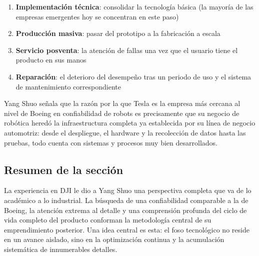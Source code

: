 \begin{enumerate}
    \item \textbf{Implementación técnica}: consolidar la tecnología básica (la mayoría de las empresas emergentes hoy se concentran en este paso)
    \item \textbf{Producción masiva}: pasar del prototipo a la fabricación a escala
    \item \textbf{Servicio posventa}: la atención de fallas una vez que el usuario tiene el producto en sus manos
    \item \textbf{Reparación}: el deterioro del desempeño tras un periodo de uso y el sistema de mantenimiento correspondiente
\end{enumerate}

Yang Shuo señala que la razón por la que Tesla es la empresa más cercana al nivel de Boeing en confiabilidad de robots es precisamente que su negocio de robótica heredó la infraestructura completa ya establecida por su línea de negocio automotriz: desde el despliegue, el hardware y la recolección de datos hasta las pruebas, todo cuenta con sistemas y procesos muy bien desarrollados.

\subsection{Resumen de la sección}

La experiencia en DJI le dio a Yang Shuo una perspectiva completa que va de lo académico a lo industrial. La búsqueda de una confiabilidad comparable a la de Boeing, la atención extrema al detalle y una comprensión profunda del ciclo de vida completo del producto conforman la metodología central de su emprendimiento posterior. Una idea central es esta: el foso tecnológico no reside en un avance aislado, sino en la optimización continua y la acumulación sistemática de innumerables detalles.
